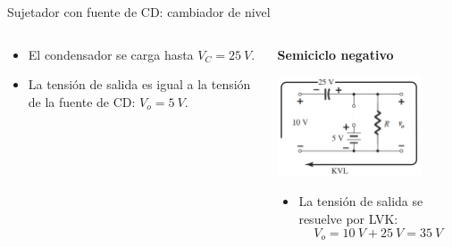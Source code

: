 \documentclass[t,aspectratio=169]{beamer}
\begin{document}
\begin{frame}{Sujetador con fuente de CD: cambiador de nivel}
\begin{columns}
\begin{column}{0.33\textwidth}
    \flushleft
    \begin{itemize}
        \item El condensador se carga hasta $V_C = 25\ V$.
        \item La tensión de salida es igual a la tensión de la fuente de CD: $V_o = 5\ V$.
    \end{itemize}

\end{column}
\begin{column}{0.33\textwidth}

    \textbf{Semiciclo negativo}

    \centering
    \includegraphics[width=0.8\textwidth]{figures/cambiador_nivel_3.png}

    \flushleft
    \begin{itemize}
        \item La tensión de salida se resuelve por LVK:
        \[ V_o = 10\ V + 25\ V = 35\ V \]
    \end{itemize}

\end{column}
\end{columns}

\end{frame}
\end{document}
